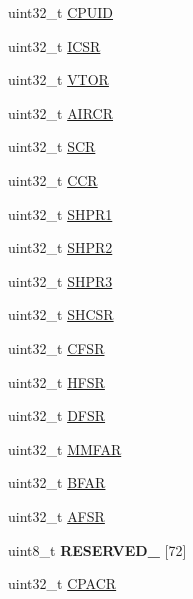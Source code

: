 \begin{DoxyCompactItemize}
\item 
uint32\+\_\+t \hyperlink{struct_s_c_b___mem_map_ad020795dcc3605b4c828af83df8b8836}{C\+P\+U\+I\+D}
\item 
uint32\+\_\+t \hyperlink{struct_s_c_b___mem_map_aafbaa0d0a4b79969877c9b84be8aaf7a}{I\+C\+S\+R}
\item 
uint32\+\_\+t \hyperlink{struct_s_c_b___mem_map_aa327db1d9948595498fba43acc8d336b}{V\+T\+O\+R}
\item 
uint32\+\_\+t \hyperlink{struct_s_c_b___mem_map_a3f874ca1c6e17ae4beadac22e8ec17ec}{A\+I\+R\+C\+R}
\item 
uint32\+\_\+t \hyperlink{struct_s_c_b___mem_map_ac8d0a0d974bde944d42429065dd2f44a}{S\+C\+R}
\item 
uint32\+\_\+t \hyperlink{struct_s_c_b___mem_map_aa6e957027d8c505047cd58101bb784aa}{C\+C\+R}
\item 
uint32\+\_\+t \hyperlink{struct_s_c_b___mem_map_afe02d5ca0102ec35b79172d453854ed0}{S\+H\+P\+R1}
\item 
uint32\+\_\+t \hyperlink{struct_s_c_b___mem_map_a1636322022eb10e4acedf40018708b68}{S\+H\+P\+R2}
\item 
uint32\+\_\+t \hyperlink{struct_s_c_b___mem_map_a8ac3a3b8dd23fb279640b98a95fb796a}{S\+H\+P\+R3}
\item 
uint32\+\_\+t \hyperlink{struct_s_c_b___mem_map_ae2b73d4b9744b878527466ec57dbfdb7}{S\+H\+C\+S\+R}
\item 
uint32\+\_\+t \hyperlink{struct_s_c_b___mem_map_a51c6a21cb789c655257efe5796c7f503}{C\+F\+S\+R}
\item 
uint32\+\_\+t \hyperlink{struct_s_c_b___mem_map_a7f0b5d6f24446f1f603a6d9ef6259de2}{H\+F\+S\+R}
\item 
uint32\+\_\+t \hyperlink{struct_s_c_b___mem_map_af178d6003a18eb7452c51edcec14ec5d}{D\+F\+S\+R}
\item 
uint32\+\_\+t \hyperlink{struct_s_c_b___mem_map_af81b60a951ac45ddc8376500ed1580ef}{M\+M\+F\+A\+R}
\item 
uint32\+\_\+t \hyperlink{struct_s_c_b___mem_map_a57e3932788931280ee70b7389c4b23f4}{B\+F\+A\+R}
\item 
uint32\+\_\+t \hyperlink{struct_s_c_b___mem_map_aa02bdd6294d9240a566fe92085f62ae1}{A\+F\+S\+R}
\item 
\hypertarget{struct_s_c_b___mem_map_a5c9626f34253e346f67a00a489dfc9b9}{}uint8\+\_\+t {\bfseries R\+E\+S\+E\+R\+V\+E\+D\+\_} \mbox{[}72\mbox{]}\label{struct_s_c_b___mem_map_a5c9626f34253e346f67a00a489dfc9b9}

\item 
uint32\+\_\+t \hyperlink{struct_s_c_b___mem_map_aa863fcf3f6eca09d9caec27247b017ae}{C\+P\+A\+C\+R}
\end{DoxyCompactItemize}


